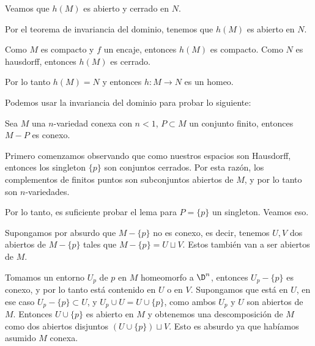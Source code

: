 \begin{dem}

    Veamos que $h(M)$ es abierto y cerrado en $N$. 

    Por el teorema de invariancia del dominio, tenemos que $h(M)$ es abierto en $N$.
    
    Como $M$ es compacto y $f$ un encaje, entonces $h(M)$ es compacto. Como $N$ es hausdorff, entonces $h(M)$ es cerrado.
    
    Por lo tanto $h(M)=N$ y entonces $h:M\to N$ es un homeo.

\end{dem}

Podemos usar la invariancia del dominio para probar lo siguiente:

\begin{lema}
    Sea $M$ una $n$-variedad conexa con $n<1$, $P\subset M$ un conjunto finito, entonces $M-P$ es conexo.
\end{lema}


\begin{dem}
    Primero comenzamos observando que como nuestros espacios son Hausdorff, entonces los singleton $\{p\}$ son conjuntos cerrados. Por esta razón, los complementos de finitos puntos son subconjuntos abiertos de $M$, y por lo tanto son $n$-variedades.

    Por lo tanto, es suficiente probar el lema para $P=\{p\}$ un singleton. Veamos eso.

    Supongamos por absurdo que $M-\{p\}$ no es conexo, es decir, tenemos $U, V$ dos abiertos de $M-\{p\}$ tales que $M-\{p\}=U\sqcup V$. Estos también van a ser abiertos de $M$.


    Tomamos un entorno $U_p$ de $p$ en $M$ homeomorfo a $\D^n$, entonces $U_p - \{p\}$ es conexo, y por lo tanto está contenido en $U$ o en $V$. Supongamos que está en $U$, en ese caso $U_p-\{p\}\subset U$, y $U_p\cup U = U\cup\{p\}$, como ambos $U_p$ y $U$ son abiertos de $M$. Entonces $U\cup \{p\}$ es abierto en $M$ y obtenemos una descomposición de $M$ como dos abiertos disjuntos $(U\cup\{p\})\sqcup V$. Esto es absurdo ya que habíamos asumido $M$ conexa.
\end{dem}
